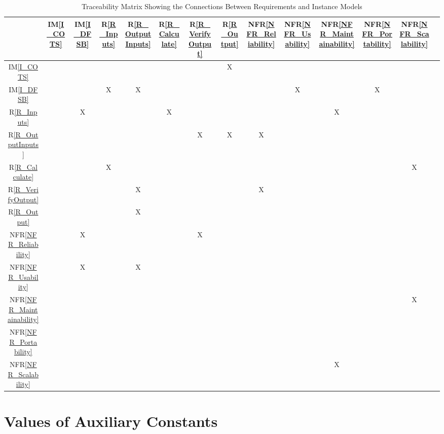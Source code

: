 \documentclass[12pt]{article}
\newcommand{\iref}[1]{IM\ref{#1}}
\newcommand{\rref}[1]{R\ref{#1}}
\newcommand{\nfrref}[1]{NFR\ref{#1}}
\begin{document}
\newpage
\begin{table}[H]
\centering
\begin{tabular}{|c|c|c|c|c|c|c|c|c|c|c|c|c|c|}
\hline
	& \iref{I_COTS} & \iref{I_DFSB} & \rref{R_Inputs} & \rref{R_OutputInputs} & \rref{R_Calculate} & \rref{R_VerifyOutput} & \rref{R_Output} & \nfrref{NFR_Reliability} & \nfrref{NFR_Usability} & \nfrref{NFR_Maintainability} & \nfrref{NFR_Portability} & \nfrref{NFR_Scalability} \\

\hline
\iref{I_COTS}         & & & & & & & X & & & & & \\ \hline
\iref{I_DFSB}         & & & X & X & & & & & X & & X &\\  \hline
\rref{R_Inputs}     & & X & & & X & & & & & X & & \\ \hline
\rref{R_OutputInputs} & & & & & & X & X & X & & & & \\ \hline
\rref{R_Calculate}     & & & X & & & & & & & & & X \\ \hline
\rref{R_VerifyOutput}  & & & & X & & & & X & & & & \\ \hline
\rref{R_Output} & & & & X & & & & & & & & \\ \hline
\nfrref{NFR_Reliability}   & & X & & & & X & & & & & & \\ \hline
\nfrref{NFR_Usability}   & & X & & X & & & & & & & & \\ \hline
\nfrref{NFR_Maintainability}   & & & & & & & & & & & & X \\ \hline
\nfrref{NFR_Portability}   & & & & & & & & & & & & \\ \hline
\nfrref{NFR_Scalability}   & & & & & & & & & & X & & \\
\hline
\end{tabular}
\caption{Traceability Matrix Showing the Connections Between Requirements and Instance Models}
\label{Table:R_trace}
\end{table}


\newpage
\section{Values of Auxiliary Constants}
\end{document}
